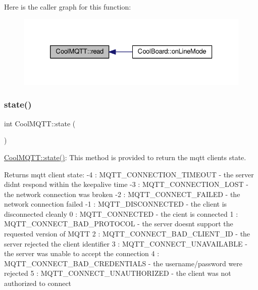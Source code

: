 Here is the caller graph for this function\+:\nopagebreak
\begin{figure}[H]
\begin{center}
\leavevmode
\includegraphics[width=326pt]{class_cool_m_q_t_t_ae3c18f6ae9723746d32765f1c8f176ca_icgraph}
\end{center}
\end{figure}
\mbox{\label{class_cool_m_q_t_t_a5d003307eff78efbd585e42b43b72b6d}} 
\subsubsection{\texorpdfstring{state()}{state()}}
{\footnotesize\ttfamily int Cool\+M\+Q\+T\+T\+::state (\begin{DoxyParamCaption}{ }\end{DoxyParamCaption})}

\hyperlink{class_cool_m_q_t_t_a5d003307eff78efbd585e42b43b72b6d}{Cool\+M\+Q\+T\+T\+::state()}\+: This method is provided to return the mqtt client\textquotesingle{}s state. \begin{DoxyReturn}{Returns}
mqtt client state\+: -\/4 \+: M\+Q\+T\+T\+\_\+\+C\+O\+N\+N\+E\+C\+T\+I\+O\+N\+\_\+\+T\+I\+M\+E\+O\+UT -\/ the server didn\textquotesingle{}t respond within the keepalive time -\/3 \+: M\+Q\+T\+T\+\_\+\+C\+O\+N\+N\+E\+C\+T\+I\+O\+N\+\_\+\+L\+O\+ST -\/ the network connection was broken -\/2 \+: M\+Q\+T\+T\+\_\+\+C\+O\+N\+N\+E\+C\+T\+\_\+\+F\+A\+I\+L\+ED -\/ the network connection failed -\/1 \+: M\+Q\+T\+T\+\_\+\+D\+I\+S\+C\+O\+N\+N\+E\+C\+T\+ED -\/ the client is disconnected cleanly 0 \+: M\+Q\+T\+T\+\_\+\+C\+O\+N\+N\+E\+C\+T\+ED -\/ the cient is connected 1 \+: M\+Q\+T\+T\+\_\+\+C\+O\+N\+N\+E\+C\+T\+\_\+\+B\+A\+D\+\_\+\+P\+R\+O\+T\+O\+C\+OL -\/ the server doesn\textquotesingle{}t support the requested version of M\+Q\+TT 2 \+: M\+Q\+T\+T\+\_\+\+C\+O\+N\+N\+E\+C\+T\+\_\+\+B\+A\+D\+\_\+\+C\+L\+I\+E\+N\+T\+\_\+\+ID -\/ the server rejected the client identifier 3 \+: M\+Q\+T\+T\+\_\+\+C\+O\+N\+N\+E\+C\+T\+\_\+\+U\+N\+A\+V\+A\+I\+L\+A\+B\+LE -\/ the server was unable to accept the connection 4 \+: M\+Q\+T\+T\+\_\+\+C\+O\+N\+N\+E\+C\+T\+\_\+\+B\+A\+D\+\_\+\+C\+R\+E\+D\+E\+N\+T\+I\+A\+LS -\/ the username/password were rejected 5 \+: M\+Q\+T\+T\+\_\+\+C\+O\+N\+N\+E\+C\+T\+\_\+\+U\+N\+A\+U\+T\+H\+O\+R\+I\+Z\+ED -\/ the client was not authorized to connect 
\end{DoxyReturn}


